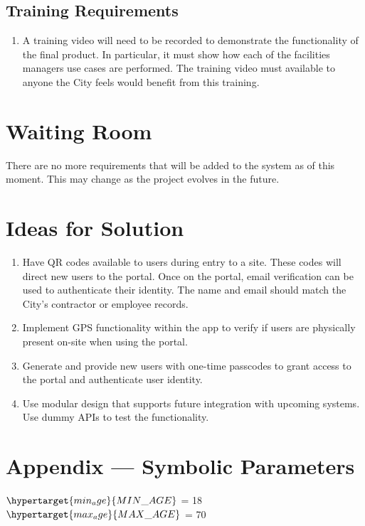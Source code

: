 \documentclass[12pt]{article}
\begin{document}
\subsection{Training Requirements}
\begin{enumerate} [{UDT-TR}1.]
  \item A training video will need to be recorded to demonstrate the
    functionality of the final product. In particular, it must show how each of
    the facilities managers use cases are performed. The training
    video must available to
    anyone the City feels would benefit from this training.
\end{enumerate}

\section{Waiting Room}
There are no more requirements that will be added to the system as of this
moment. This may change as the project evolves in the future.

\section{Ideas for Solution}
\begin{enumerate}
  \item Have QR codes available to users during entry to a site.
    These codes will direct new users to the portal. Once on the
    portal, email verification can be used to authenticate their
    identity. The name and email should match the City's contractor
    or employee records.
  \item Implement GPS functionality within the app to verify if users
    are physically present on-site when using the portal.
  \item Generate and provide new users with one-time passcodes to
    grant access to the portal and authenticate user identity.
  \item Use modular design that supports future integration with
    upcoming systems. Use dummy APIs to test the functionality.
\end{enumerate}

\newpage{}
\section*{Appendix --- Symbolic Parameters}
$\hypertarget{min_age}{MIN\_AGE}$ = 18\\
$\hypertarget{max_age}{MAX\_AGE}$ = 70
\end{document}
